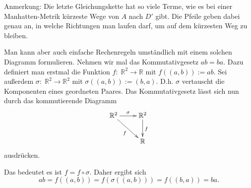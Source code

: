 \documentclass[a4paper,12pt,fleqn]{article}
\begin{document}
Anmerkung: Die letzte Gleichungskette hat so viele Terme,
wie es bei einer Manhatten-Metrik kürzeste
Wege von \(A\) nach \(D'\) gibt. Die Pfeile
geben dabei genau an, in welche Richtungen
man laufen darf, um auf dem kürzesten Weg
zu bleiben.

Man kann aber auch einfache Rechenregeln umständlich
mit einem solchen Diagramm formulieren. Nehmen wir mal
das Kommutativgesetz \(ab=ba\). Dazu definiert man erstmal
die Funktion \(f{:}\;\mathbb R^2\rightarrow\mathbb R\) mit
\(f((a,b)):=ab\). Sei außerdem
\(\sigma{:}\;\mathbb R^2\rightarrow\mathbb R^2\)
mit \(\sigma((a,b)):=(b,a)\). D.h. \(\sigma\) vertauscht die
Komponenten eines geordneten Paares. Das Kommutativgesetz lässt sich
nun durch das kommutierende Diagramm
\[\xymatrix{\mathbb R^2 \ar[r]^\sigma \ar[dr]_f &\ar[d]^f \mathbb R^2\\
& \mathbb R}\]
ausdrücken.

Das bedeutet es ist \(f=f\circ\sigma\). Daher ergibt sich
\[ab = f((a,b))=f(\sigma((a,b))) = f((b,a)) = ba.\]
\end{document}
